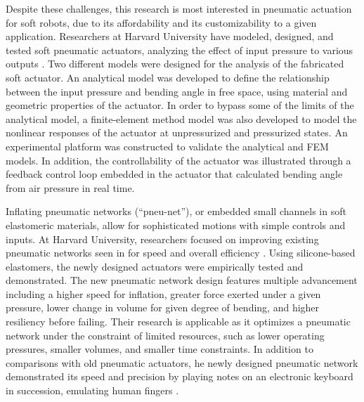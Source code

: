 \documentclass{IEEEtran}
\begin{document}
Despite these challenges, this research is most interested in pneumatic actuation for soft robots, due to its affordability and its customizability to a given application.  Researchers at Harvard University have modeled, designed, and tested soft pneumatic actuators, analyzing the effect of input pressure to various outputs \cite{polygerinos2015modeling}.  Two different models were designed for the analysis of the fabricated soft actuator.  An analytical model was developed to define the relationship between the input pressure and bending angle in free space, using material and geometric properties of the actuator.  In order to bypass some of the limits of the analytical model, a finite-element method model was also developed to model the nonlinear responses of the actuator at unpressurized and pressurized states.  An experimental platform was constructed to validate the analytical and FEM models.  In addition, the controllability of the actuator was illustrated through a feedback control loop embedded in the actuator that calculated bending angle from air pressure in real time.

Inflating pneumatic networks (``pneu-net''), or embedded small channels in soft elastomeric materials, allow for sophisticated motions with simple controls and inputs.  At Harvard University, researchers focused on improving existing pneumatic networks seen in \cite{polygerinos2015modeling} for speed and overall efficiency \cite{mosadegh2014pneumatic}.  Using silicone-based elastomers, the newly designed actuators were empirically tested and demonstrated.  The new pneumatic network design features multiple advancement including a higher speed for inflation, greater force exerted under a given pressure, lower change in volume for given degree of bending, and higher resiliency before failing.  Their research is applicable as it optimizes a pneumatic network under the constraint of limited resources, such as lower operating pressures, smaller volumes, and smaller time constraints.  In addition to comparisons with old pneumatic actuators, he newly designed pneumatic network demonstrated its speed and precision by playing notes on an electronic keyboard in succession, emulating human fingers \cite{mosadegh2014pneumatic}. 
\end{document}
